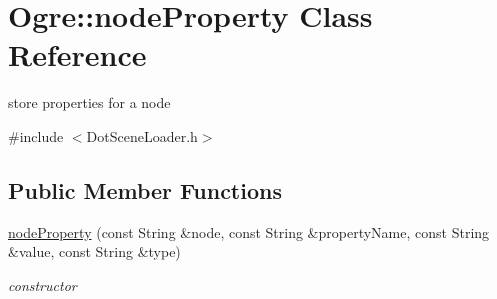 \hypertarget{class_ogre_1_1node_property}{}\section{Ogre\+:\+:node\+Property Class Reference}
\label{class_ogre_1_1node_property}


store properties for a node  




{\ttfamily \#include $<$Dot\+Scene\+Loader.\+h$>$}

\subsection*{Public Member Functions}
\begin{DoxyCompactItemize}
\item 
\hyperlink{class_ogre_1_1node_property_ae092388b17f66e4171a8ee11e0837e7d}{node\+Property} (const String \&node, const String \&property\+Name, const String \&value, const String \&type)\hypertarget{class_ogre_1_1node_property_ae092388b17f66e4171a8ee11e0837e7d}{}\label{class_ogre_1_1node_property_ae092388b17f66e4171a8ee11e0837e7d}

\begin{DoxyCompactList}\small\item\em constructor \end{DoxyCompactList}\end{DoxyCompactItemize}

